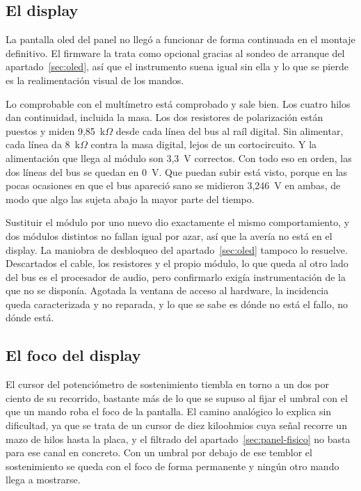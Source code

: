 \subsection*{El display}

La pantalla \gls{oled} del panel no llegó a funcionar de forma continuada en el
montaje definitivo. El firmware la trata como opcional gracias al sondeo de
arranque del apartado~\ref{sec:oled}, así que el instrumento suena igual sin
ella y lo que se pierde es la realimentación visual de los mandos.

Lo comprobable con el multímetro está comprobado y sale bien. Los cuatro hilos
dan continuidad, incluida la masa. Los dos resistores de polarización están
puestos y miden 9,85~k$\Omega$ desde cada línea del bus al raíl digital. Sin
alimentar, cada línea da 8~k$\Omega$ contra la masa digital, lejos de un
cortocircuito. Y la alimentación que llega al módulo son 3,3~V correctos. Con
todo eso en orden, las dos líneas del bus se quedan en 0~V. Que puedan subir
está visto, porque en las pocas ocasiones en que el bus apareció sano se
midieron 3,246~V en ambas, de modo que algo las sujeta abajo la mayor parte del
tiempo.

Sustituir el módulo por uno nuevo dio exactamente el mismo comportamiento, y
dos módulos distintos no fallan igual por azar, así que la avería no está en el
display. La maniobra de desbloqueo del apartado~\ref{sec:oled} tampoco lo
resuelve. Descartados el cable, los resistores y el propio módulo, lo que queda
al otro lado del bus es el procesador de audio, pero confirmarlo exigía
instrumentación de la que no se disponía. Agotada la ventana de acceso al
hardware, la incidencia queda caracterizada y no reparada, y lo que se sabe es
dónde no está el fallo, no dónde está.

\subsection*{El foco del display}

El cursor del potenciómetro de sostenimiento tiembla en torno a un dos por
ciento de su recorrido, bastante más de lo que se supuso al fijar el umbral con
el que un mando roba el foco de la pantalla. El camino analógico lo explica sin
dificultad, ya que se trata de un cursor de diez kiloohmios cuya señal recorre
un mazo de hilos hasta la placa, y el filtrado del
apartado~\ref{sec:panel-fisico} no basta para ese canal en concreto. Con un
umbral por debajo de ese temblor el sostenimiento se queda con el foco de forma
permanente y ningún otro mando llega a mostrarse.

